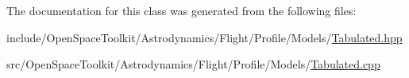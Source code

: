 The documentation for this class was generated from the following files\+:\begin{DoxyCompactItemize}
\item 
include/\+Open\+Space\+Toolkit/\+Astrodynamics/\+Flight/\+Profile/\+Models/\hyperlink{_flight_2_profile_2_models_2_tabulated_8hpp}{Tabulated.\+hpp}\item 
src/\+Open\+Space\+Toolkit/\+Astrodynamics/\+Flight/\+Profile/\+Models/\hyperlink{_flight_2_profile_2_models_2_tabulated_8cpp}{Tabulated.\+cpp}\end{DoxyCompactItemize}
